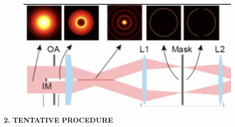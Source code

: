 \documentclass{article}
\theoremstyle{definition}
\begin{document}
\begin{figure}[!htb]
\centering
\includegraphics[scale=0.45]{hollow_beam.png}
\end{figure}






\newpage



\noindent \textbf{2. TENTATIVE PROCEDURE}
\end{document}
